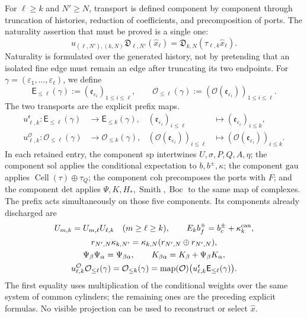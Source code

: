 For \(\ell\geq k\) and \(N'\geq N\), transport is defined component by
component through truncation of histories, reduction of coefficients, and
precomposition of ports. The naturality assertion that must be proved is
a single one:
\begin{equation}
\label{eq:pdfv2-cor-naturalidad-unica}
 u_{(\ell,N'),(k,N)}\mathfrak D_{\ell,N'}(\widehat x_\ell)
 =\mathfrak D_{k,N}(\tau_{\ell,k}\widehat x_\ell).
\end{equation}
Naturality is formulated over the generated history, not by pretending that an
isolated fine edge must remain an edge after truncating its two
endpoints. For
\(\gamma=(\varepsilon_1,\ldots,\varepsilon_\ell)\), we define
\[
 \mathsf E_{\leq\ell}(\gamma)
 :=(\mathfrak e_{\varepsilon_i})_{1\leq i\leq\ell},
 \qquad
 \mathcal O_{\leq\ell}(\gamma)
 :=(\mathcal O(\mathfrak e_{\varepsilon_i}))_{1\leq i\leq\ell}.
\]
The two transports are the explicit prefix maps.
\begin{align}
 u^{\mathfrak e}_{\ell,k}:
 \mathsf E_{\leq\ell}(\gamma)&\longrightarrow
 \mathsf E_{\leq k}(\gamma),&
 (\mathfrak e_{\varepsilon_i})_{i\leq\ell}
 &\longmapsto(\mathfrak e_{\varepsilon_i})_{i\leq k},
 \label{eq:pdfv2-cor-transporte-arista}\\
 u^{\mathcal O}_{\ell,k}:
 \mathcal O_{\leq\ell}(\gamma)&\longrightarrow
 \mathcal O_{\leq k}(\gamma),&
 (\mathcal O(\mathfrak e_{\varepsilon_i}))_{i\leq\ell}
 &\longmapsto
 (\mathcal O(\mathfrak e_{\varepsilon_i}))_{i\leq k}.
 \label{eq:pdfv2-cor-transporte-accion}
\end{align}
In each retained entry, the component \(\mathrm{sp}\) intertwines
\(U,\sigma,P,Q,A,\eta\); the component \(\mathrm{sol}\) applies the conditional
expectation to \(b,b^\pm,\kappa\); the component \(\mathrm{gau}\) applies
\(\operatorname{Cell}(\tau)\oplus\tau_Q\); the component \(\mathrm{coh}\)
precomposes the ports with \(F\); and the component \(\mathrm{det}\) applies
\(\Psi,K,H_*,\operatorname{Smith},\operatorname{Boc}\) to the same map of
complexes. The prefix acts simultaneously on those five components.
Its components already discharged are
\begin{equation}
\label{eq:pdfv2-cor-naturalidad-componentes}
 \begin{gathered}
 U_{m,k}=U_{m,\ell}U_{\ell,k}\quad(m\geq\ell\geq k),\qquad
 E_kb_f^\pm=b_c^\pm+\kappa_k^{\rm can},\\
 r_{N',N}\kappa_{k,N'}=
 \kappa_{k,N}(r_{N',N}\oplus r_{N',N}),\\
 \Psi_\beta\Psi_\alpha=\Psi_{\beta\alpha},
 \qquad K_{\beta\alpha}=K_\beta+\Psi_\beta K_\alpha,\\
 u^{\mathcal O}_{\ell,k}\mathcal O_{\leq\ell}(\gamma)
 =\mathcal O_{\leq k}(\gamma)
 =\operatorname{map}(\mathcal O)\bigl(u^{\mathfrak e}_{\ell,k}
                    \mathsf E_{\leq\ell}(\gamma)\bigr).
 \end{gathered}
\end{equation}
The first equality uses multiplication of the conditional weights over the same
system of common cylinders; the remaining ones are the preceding explicit
formulas. No visible projection
can be used to reconstruct or select \(\widehat x\).

